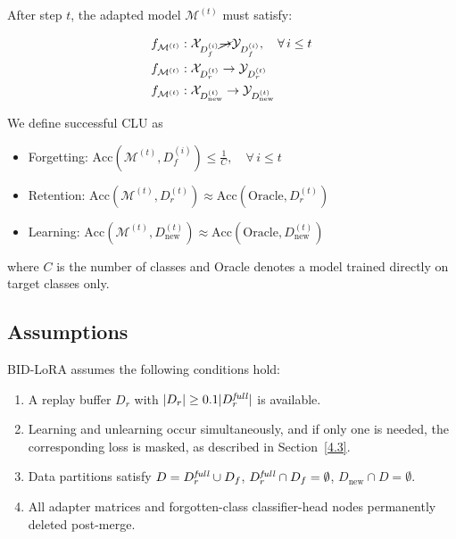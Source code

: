 After step $t$, the adapted model $\mathcal{M}^{(t)}$ must satisfy:

\begin{subequations}
\label{Eq:3}
\begin{align}
    f_{\mathcal{M}^{(t)}} &: \mathcal{X}_{D_{f}^{(i)}} \cancel{\rightarrow} \mathcal{Y}_{D_{f}^{(i)}}, \quad \forall \, i \leq t \label{Eq:3a} \\
    f_{\mathcal{M}^{(t)}} &: \mathcal{X}_{D_{r}^{(t)}} \rightarrow \mathcal{Y}_{D_{r}^{(t)}} \label{Eq:3b} \\
    f_{\mathcal{M}^{(t)}} &: \mathcal{X}_{D_{\text{new}}^{(t)}} \rightarrow \mathcal{Y}_{D_{\text{new}}^{(t)}} \label{Eq:3c}
\end{align}
\end{subequations}


We define successful CLU as 
\begin{itemize}
    \item Forgetting: $\text{Acc}(\mathcal{M}^{(t)}, D_f^{(i)}) \leq \frac{1}{C}, \quad \forall \, i \leq t$
    \item Retention: $\text{Acc}(\mathcal{M}^{(t)}, D_r^{(t)}) \approx \text{Acc}(\text{Oracle}, D_r^{(t)})$
    \item Learning: $\text{Acc}(\mathcal{M}^{(t)}, D_{\text{new}}^{(t)}) \approx \text{Acc}(\text{Oracle}, D_{\text{new}}^{(t)})$
\end{itemize}
where $C$ is the number of classes and Oracle denotes a model trained directly on target classes only.

\subsection{Assumptions}
\label{3.2}
BID-LoRA assumes the following conditions hold:
\begin{enumerate}
    \item A replay buffer $D_r$ with $|D_r| \geq 0.1|D^\text{\textit{full}}_r|$ is available.
    \item Learning and unlearning occur simultaneously, and if only one is needed, the corresponding loss is masked, as described in Section~\ref{4.3}.
    \item Data partitions satisfy $D = D^\text{\textit{full}}_r \cup D_f$, $D^\text{\textit{full}}_r \cap D_f = \emptyset$, $D_{\text{new}} \cap D = \emptyset$.
    \item All adapter matrices and forgotten-class classifier-head nodes permanently deleted post-merge.
\end{enumerate}


